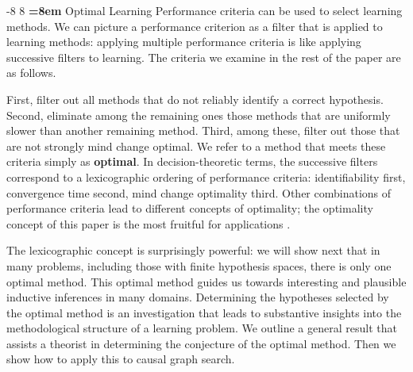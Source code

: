 \documentclass{elsarticle}%
\makeatletter
\renewcommand\subsection{\@startsection {subsection}{1}{\z@}%
  {-8\p@ \@plus -4\p@ \@minus -4\p@}%
                       {8\p@ \@plus 4\p@ \@minus 4\p@}%
                                   {\normalfont\large\bfseries\boldmath
                                   \rightskip=\z@ \@plus 8em\pretolerance=10000 }}
\makeatother
\begin{document}
\subsection{Optimal Learning}
Performance criteria can be used to select learning methods. We can picture a performance criterion as a filter that is applied to learning methods: applying multiple performance criteria is like applying successive filters to learning. The criteria we examine in the rest of the paper are as follows. 

First, filter out all methods that do not reliably identify a correct hypothesis.  Second, eliminate among the remaining ones those methods that are uniformly slower than another remaining method. Third, among these, filter out those that are not strongly mind change optimal. We refer to a method that meets these criteria simply as \textbf{optimal}. In decision-theoretic terms, the successive filters correspond to a lexicographic ordering of performance criteria: identifiability first,  convergence time second, mind change optimality third. Other combinations of performance criteria lead to different concepts of optimality; the optimality concept of this paper is the most fruitful for applications \cite{bib:bjps, bib:kev-causal}.

 The lexicographic concept is surprisingly powerful: we will show next that in many problems, including those with finite hypothesis spaces, there is only one optimal method. This optimal method guides us towards interesting and plausible inductive inferences in many domains. Determining the hypotheses selected by the optimal method is an investigation that leads to substantive insights into the methodological structure of a learning problem.  We outline a general result that assists a theorist in determining the conjecture of the optimal method. Then we show how to apply this to causal graph search.
\end{document}
